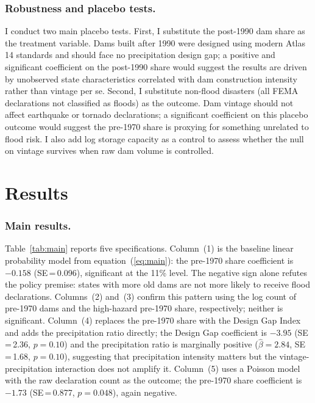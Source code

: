 \documentclass[12pt]{article}
\begin{document}
\subsubsection*{Robustness and placebo tests.}

I conduct two main placebo tests. First, I substitute the post-1990 dam share as the treatment variable. Dams built after 1990 were designed using modern Atlas 14 standards and should face no precipitation design gap; a positive and significant coefficient on the post-1990 share would suggest the results are driven by unobserved state characteristics correlated with dam construction intensity rather than vintage per se. Second, I substitute non-flood disasters (all FEMA declarations not classified as floods) as the outcome. Dam vintage should not affect earthquake or tornado declarations; a significant coefficient on this placebo outcome would suggest the pre-1970 share is proxying for something unrelated to flood risk. I also add log storage capacity as a control to assess whether the null on vintage survives when raw dam volume is controlled.

\section{Results}

\subsubsection*{Main results.}

Table~\ref{tab:main} reports five specifications. Column~(1) is the baseline linear probability model from equation~(\ref{eq:main}): the pre-1970 share coefficient is $-0.158$ (SE\,=\,0.096), significant at the 11\% level. The negative sign alone refutes the policy premise: states with more old dams are not more likely to receive flood declarations. Columns~(2) and~(3) confirm this pattern using the log count of pre-1970 dams and the high-hazard pre-1970 share, respectively; neither is significant. Column~(4) replaces the pre-1970 share with the Design Gap Index and adds the precipitation ratio directly; the Design Gap coefficient is $-3.95$ (SE\,=\,2.36, $p = 0.10$) and the precipitation ratio is marginally positive ($\hat{\beta} = 2.84$, SE\,=\,1.68, $p = 0.10$), suggesting that precipitation intensity matters but the vintage-precipitation interaction does not amplify it. Column~(5) uses a Poisson model with the raw declaration count as the outcome; the pre-1970 share coefficient is $-1.73$ (SE\,=\,0.877, $p = 0.048$), again negative.
\end{document}
